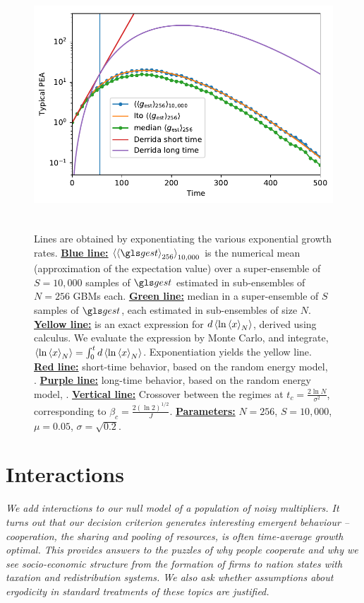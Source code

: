 \begin{figure}
\centering
\includegraphics[height=9.3cm]{./chapter_3/figs/PEA.pdf}
\caption{Lines are obtained by exponentiating the various exponential 
growth rates. {\bf \underline{Blue line:}} $\ave{\ave{\gest}_{256}}_{10,000}$ is the numerical mean 
(approximation of the expectation value) 
over a super-ensemble of $S=10,000$ samples of $\gest$ estimated in sub-ensembles of $N=256$ GBMs each. 
{\bf \underline{Green line:}} median in a super-ensemble of $S$ samples of $\gest$, each estimated in sub-ensembles of size $N$. 
{\bf \underline{Yellow line:}}  is an exact expression for $d\left\langle\ln\left\langle x \right\rangle_N \right\rangle$, derived using \Ito calculus. We evaluate the expression by Monte Carlo, and integrate, $\left\langle\ln\left\langle x \right\rangle_N \right\rangle=\int_{0}^{t} d\left\langle\ln\left\langle x \right\rangle_N \right\rangle$. Exponentiation yields the yellow line. 
{\bf \underline{Red line:}} short-time behavior, based on the random energy model, .
{\bf \underline{Purple line:}} long-time behavior, based on the random energy model, . {\bf \underline{Vertical line:}} Crossover between the regimes at $t_c=\frac{2\ln N}{\sigma^2}$, corresponding to $\beta_c=\frac{2(\ln 2)^{1/2}}{J}$.
{\bf \underline{Parameters:}} $N=256$, $S=10,000$, $\mu=0.05$, $\sigma=\sqrt{0.2}$.}
\end{figure}
\FloatBarrier

\newpage


\section{Interactions}
{\it
We add interactions to our null model of a population of noisy multipliers. It turns out that our decision criterion generates interesting emergent behaviour -- cooperation, the sharing and pooling of resources, is often time-average 
growth optimal. This provides answers to the puzzles of why people cooperate and why we see socio-economic structure from the formation of firms to nation states with taxation and redistribution systems. We also ask whether assumptions about ergodicity in standard treatments of these topics are justified.}
\newpage


